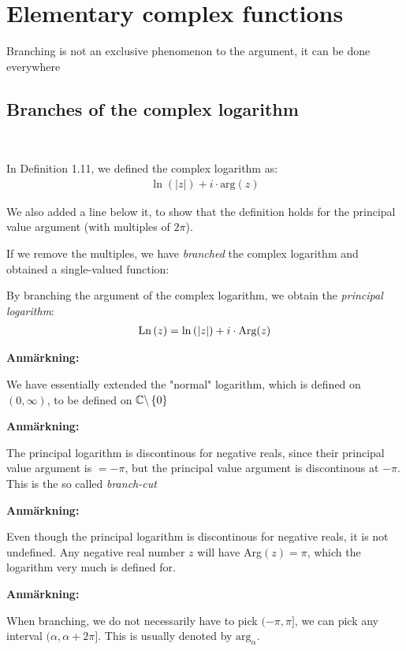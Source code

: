 \section{Elementary complex functions}\par
\noindent Branching is not an exclusive phenomenon to the argument, it can be done everywhere
\par\bigskip
\subsection{Branches of the complex logarithm}\hfill\\\par
\noindent In Definition 1.11, we defined the complex logarithm as:
\begin{equation*}
  \begin{gathered}
    \ln{\left(\left|z\right|\right)}+i\cdot\text{arg}(z)
  \end{gathered}
\end{equation*}
\par\bigskip
\noindent We also added a line below it, to show that the definition holds for the principal value argument (with multiples of $2\pi$).\par
\noindent If we remove the multiples, we have \textit{branched} the complex logarithm and obtained a single-valued function:
\par\bigskip
\begin{theo}{}
  By branching the argument of the complex logarithm, we obtain the \textit{principal logarithm}:
  \begin{equation*}
    \begin{gathered}
      \text{Ln}\left(z\right) = \ln{\left(\left|z\right|\right)}+i\cdot\text{Arg}(z)\\
    \end{gathered}
  \end{equation*}
\end{theo}
\par\bigskip
\noindent\textbf{Anmärkning:}\par
\noindent We have essentially extended the "normal" logarithm, which is defined on $(0,\infty)$, to be defined on $\mathbb{C}\backslash\left\{0\right\}$
\par\bigskip
\noindent\textbf{Anmärkning:}\par
\noindent The principal logarithm is discontinous for negative reals, since their principal value argument is $=-\pi$, but the principal value argument is discontinous at $-\pi$. This is the so called \textit{branch-cut}
\par\bigskip
\noindent\textbf{Anmärkning:}\par
\noindent Even though the principal logarithm is discontinous for negative reals, it is not undefined. Any negative real number $z$ will have Arg$(z) = \pi$, which the logarithm very much is defined for.
\par\bigskip
\noindent\textbf{Anmärkning:}\par
\noindent When branching, we do not necessarily have to pick $(-\pi,\pi]$, we can pick any interval $(\alpha,\alpha+2\pi]$. This is usually denoted by $\text{arg}_\alpha$.
\par\bigskip
